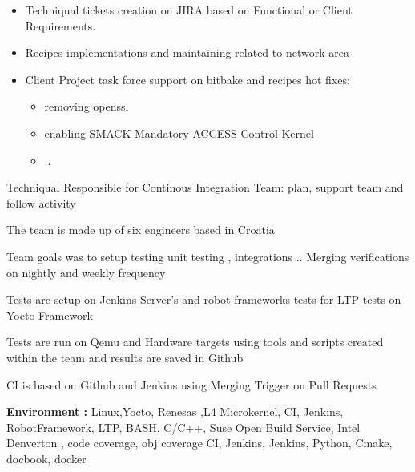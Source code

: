 \documentclass[11pt, a4paper]{awesome-cv} %
\begin{document}
\begin{cventries}
{\begin{cvitems}
\begin{itemize}
                \item Techniqual tickets creation on JIRA based on Functional or Client Requirements.
                \item Recipes implementations and maintaining related to network area
                \item Client Project task force support on bitbake and recipes hot fixes:
                \begin{itemize}
                    \item removing openssl
                    \item enabling SMACK Mandatory ACCESS Control Kernel
                    \item ..
                  \end{itemize}
              \end{itemize}
            \item {Techniqual Responsible for Continous Integration Team: plan, support team and follow activity}
            \item {The team is made up of six engineers based in Croatia }
            \item {Team goals was to setup testing unit testing , integrations .. Merging verifications on nightly and weekly frequency}
            \item {Tests are setup on Jenkins Server's and robot frameworks tests for LTP tests on Yocto Framework}
            \item {Tests are run on Qemu and Hardware targets using tools and scripts created within the team and results are saved in Github}
            \item {CI is based on Github and Jenkins using Merging Trigger on Pull Requests}
            \item { \textbf{Environment :} Linux,Yocto, Renesas ,L4 Microkernel, CI, Jenkins, RobotFramework, LTP, BASH, C/C++, Suse Open Build Service, Intel Denverton , code coverage, obj coverage CI, Jenkins, Jenkins, Python, Cmake, docbook, docker}
        \end{cvitems}
    }




\end{cventries}
\end{document}
